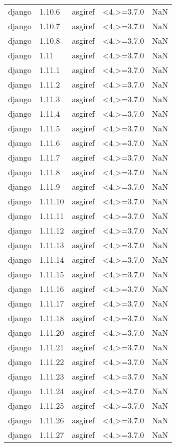 \begin{tabular}{llllr}
django & 1.10.6 & asgiref & <4,>=3.7.0 & NaN \\
django & 1.10.7 & asgiref & <4,>=3.7.0 & NaN \\
django & 1.10.8 & asgiref & <4,>=3.7.0 & NaN \\
django & 1.11 & asgiref & <4,>=3.7.0 & NaN \\
django & 1.11.1 & asgiref & <4,>=3.7.0 & NaN \\
django & 1.11.2 & asgiref & <4,>=3.7.0 & NaN \\
django & 1.11.3 & asgiref & <4,>=3.7.0 & NaN \\
django & 1.11.4 & asgiref & <4,>=3.7.0 & NaN \\
django & 1.11.5 & asgiref & <4,>=3.7.0 & NaN \\
django & 1.11.6 & asgiref & <4,>=3.7.0 & NaN \\
django & 1.11.7 & asgiref & <4,>=3.7.0 & NaN \\
django & 1.11.8 & asgiref & <4,>=3.7.0 & NaN \\
django & 1.11.9 & asgiref & <4,>=3.7.0 & NaN \\
django & 1.11.10 & asgiref & <4,>=3.7.0 & NaN \\
django & 1.11.11 & asgiref & <4,>=3.7.0 & NaN \\
django & 1.11.12 & asgiref & <4,>=3.7.0 & NaN \\
django & 1.11.13 & asgiref & <4,>=3.7.0 & NaN \\
django & 1.11.14 & asgiref & <4,>=3.7.0 & NaN \\
django & 1.11.15 & asgiref & <4,>=3.7.0 & NaN \\
django & 1.11.16 & asgiref & <4,>=3.7.0 & NaN \\
django & 1.11.17 & asgiref & <4,>=3.7.0 & NaN \\
django & 1.11.18 & asgiref & <4,>=3.7.0 & NaN \\
django & 1.11.20 & asgiref & <4,>=3.7.0 & NaN \\
django & 1.11.21 & asgiref & <4,>=3.7.0 & NaN \\
django & 1.11.22 & asgiref & <4,>=3.7.0 & NaN \\
django & 1.11.23 & asgiref & <4,>=3.7.0 & NaN \\
django & 1.11.24 & asgiref & <4,>=3.7.0 & NaN \\
django & 1.11.25 & asgiref & <4,>=3.7.0 & NaN \\
django & 1.11.26 & asgiref & <4,>=3.7.0 & NaN \\
django & 1.11.27 & asgiref & <4,>=3.7.0 & NaN \\

\end{tabular}
